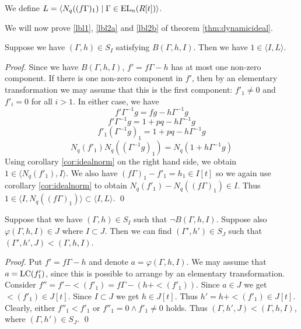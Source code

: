 \begin{definition}[$L$]\label{def:L}
  We define $L = \langle N_q ((f \Gamma)_1) \mid \Gamma \in \text{EL}_n(R[t]) \rangle$.
\end{definition}

We will now prove \ref{lbl1}, \ref{lbl2a} and \ref{lbl2b} of theorem \ref{thm:dynamicideal}.

\begin{lemma}[1]
  Suppose we have $(\Gamma, h) \in S_I$ satisfying $B(\Gamma,h,I)$.
  Then we have $1 \in \langle I, L \rangle$.
\end{lemma}
\begin{proof}
  Since we have $B(\Gamma,h,I)$, $f' = f \Gamma - h$ has at most one non-zero component.
  If there is one non-zero component in $f'$, then by an elementary transformation we may assume that this is the first component: $f'_1 \neq 0$ and $f'_i = 0$ for all $i > 1$.
  In either case, we have
  \[
    f'\Gamma^{-1} g = f g - h \Gamma^{-1} g
  \]
  \[
    f'\Gamma^{-1} g = 1 + pq - h \Gamma^{-1} g
  \]
  \[
    f'_1 (\Gamma^{-1} g)_1 = 1 + pq - h \Gamma^{-1} g
  \]
  \[
    N_q(f'_1) N_q((\Gamma^{-1} g)_1) = N_q(1 + h \Gamma^{-1} g)
  \]
  Using corollary \ref{cor:idealnorm} on the right hand side, we obtain $1 \in \langle N_q(f'_1) , I \rangle$.
  We also have $(f \Gamma)_1 - f'_1 = h_1 \in I[t]$ so we again use corollary \ref{cor:idealnorm} to obtain $N_q(f'_1) - N_q((f \Gamma)_1) \in I$. Thus $1 \in \langle I, N_q((f \Gamma)_1) \rangle \subset \langle I ,L \rangle$.
  \qed
\end{proof}

\begin{lemma}[2a]
  Suppose that we have $(\Gamma,h) \in S_I$ such that $\neg B(\Gamma,h, I)$.
  Suppose also $\varphi(\Gamma,h,I) \in J$ where $I \subset J$.
  Then we can find $(\Gamma',h') \in S_J$ such that $(\Gamma',h',J) < (\Gamma, h, I)$.
\end{lemma}
\begin{proof}
  Put $f' = f \Gamma - h$ and denote $a = \varphi(\Gamma,h,I)$.
  We may assume that $a = \text{LC}(f'_1)$, since this is possible to arrange by an elementary transformation.
  Consider $f'' = f' - \lt(f'_1) = f \Gamma - (h + \lt(f'_1))$.
  Since $a \in J$ we get $\lt(f'_1) \in J[t]$.
  Since $I \subset J$ we get $h \in J[t]$.
  Thus $h' = h + \lt(f'_1) \in J[t]$.
  Clearly, either $f''_1 < f'_1$ or $f''_1 = 0 \wedge f'_1 \neq 0$ holds.
  Thus $(\Gamma, h',J) < (\Gamma, h,I)$, where $(\Gamma,h') \in S_J$.
  \qed
\end{proof}

